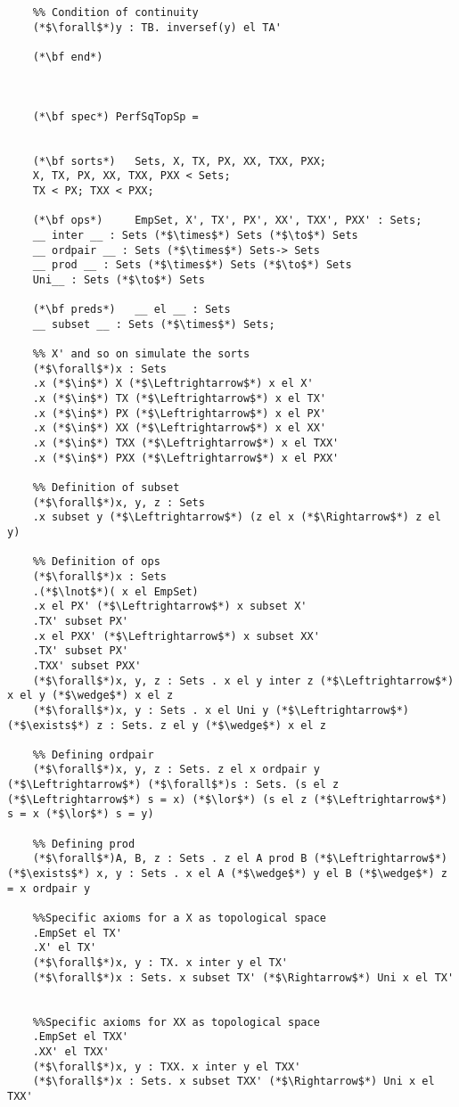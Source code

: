 \documentclass{standalone}
\begin{document}
\begin{lstlisting}
	%% Condition of continuity
	(*$\forall$*)y : TB. inversef(y) el TA'   
	
	(*\bf end*)
	
	
	
	(*\bf spec*) PerfSqTopSp =
	
	
	(*\bf sorts*)   Sets, X, TX, PX, XX, TXX, PXX;
	X, TX, PX, XX, TXX, PXX < Sets;
	TX < PX; TXX < PXX;
	
	(*\bf ops*)     EmpSet, X', TX', PX', XX', TXX', PXX' : Sets;
	__ inter __ : Sets (*$\times$*) Sets (*$\to$*) Sets
	__ ordpair __ : Sets (*$\times$*) Sets-> Sets
	__ prod __ : Sets (*$\times$*) Sets (*$\to$*) Sets
	Uni__ : Sets (*$\to$*) Sets
	
	(*\bf preds*)   __ el __ : Sets
	__ subset __ : Sets (*$\times$*) Sets;
	
	%% X' and so on simulate the sorts
	(*$\forall$*)x : Sets
	.x (*$\in$*) X (*$\Leftrightarrow$*) x el X'
	.x (*$\in$*) TX (*$\Leftrightarrow$*) x el TX'
	.x (*$\in$*) PX (*$\Leftrightarrow$*) x el PX'
	.x (*$\in$*) XX (*$\Leftrightarrow$*) x el XX'
	.x (*$\in$*) TXX (*$\Leftrightarrow$*) x el TXX'
	.x (*$\in$*) PXX (*$\Leftrightarrow$*) x el PXX'
	
	%% Definition of subset
	(*$\forall$*)x, y, z : Sets
	.x subset y (*$\Leftrightarrow$*) (z el x (*$\Rightarrow$*) z el y)
	
	%% Definition of ops
	(*$\forall$*)x : Sets
	.(*$\lnot$*)( x el EmpSet)
	.x el PX' (*$\Leftrightarrow$*) x subset X'  
	.TX' subset PX'  
	.x el PXX' (*$\Leftrightarrow$*) x subset XX'  
	.TX' subset PX'  
	.TXX' subset PXX'  
	(*$\forall$*)x, y, z : Sets . x el y inter z (*$\Leftrightarrow$*) x el y (*$\wedge$*) x el z 
	(*$\forall$*)x, y : Sets . x el Uni y (*$\Leftrightarrow$*) (*$\exists$*) z : Sets. z el y (*$\wedge$*) x el z
	
	%% Defining ordpair
	(*$\forall$*)x, y, z : Sets. z el x ordpair y (*$\Leftrightarrow$*) (*$\forall$*)s : Sets. (s el z (*$\Leftrightarrow$*) s = x) (*$\lor$*) (s el z (*$\Leftrightarrow$*) s = x (*$\lor$*) s = y)  
	
	%% Defining prod
	(*$\forall$*)A, B, z : Sets . z el A prod B (*$\Leftrightarrow$*) (*$\exists$*) x, y : Sets . x el A (*$\wedge$*) y el B (*$\wedge$*) z = x ordpair y 	
	
	%%Specific axioms for a X as topological space
	.EmpSet el TX'
	.X' el TX'
	(*$\forall$*)x, y : TX. x inter y el TX'
	(*$\forall$*)x : Sets. x subset TX' (*$\Rightarrow$*) Uni x el TX'
	
	
	%%Specific axioms for XX as topological space
	.EmpSet el TXX'
	.XX' el TXX'
	(*$\forall$*)x, y : TXX. x inter y el TXX'
	(*$\forall$*)x : Sets. x subset TXX' (*$\Rightarrow$*) Uni x el TXX'
	

\end{lstlisting}
\end{document}
